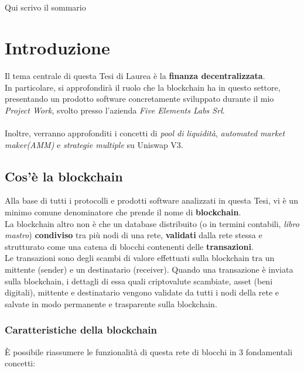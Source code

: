\documentclass[12pt,a4paper]{report}
\makeatletter
\renewenvironment{abstract}{%
    \if@twocolumn
      \section*{\abstractname}%
    \else
      \begin{center}%
        {\bfseries \Large\abstractname\vspace{\z@}}
      \end{center}%
      \quotation
    \fi}
    {\if@twocolumn\else\endquotation\fi}
\makeatother
\begin{document}
\begin{abstract}
   Qui scrivo il sommario
\end{abstract}
\tableofcontents






\chapter{Introduzione}
\noindent Il tema centrale di questa Tesi di Laurea è la \textbf{finanza decentralizzata}.\\ In particolare, si approfondirà il ruolo che la blockchain ha in questo settore, presentando un prodotto software concretamente sviluppato durante il mio  \textit{Project Work}, svolto presso l'azienda \textit{Five Elements Labs Srl}.
\\\\Inoltre, verranno approfonditi i concetti di \textit{pool di liquidità}, \textit{automated market maker(AMM)} e \textit{strategie multiple} su Uniswap V3.

\section{Cos'è la blockchain}

Alla base di tutti i protocolli e prodotti software analizzati in questa Tesi, vi è un minimo comune denominatore che prende il nome di \textbf{blockchain}\cite{blockchain}.
\\La blockchain altro non è che un database distribuito (o in termini contabili, \textit{libro mastro}) \textbf{condiviso} tra più nodi di una rete, \textbf{validati} dalla rete stessa e strutturato come una catena di blocchi contenenti delle \textbf{transazioni}.
\\Le transazioni sono degli scambi di valore effettuati sulla blockchain tra un mittente (sender) e un destinatario (receiver).
Quando una transazione è inviata sulla blockchain, i dettagli di essa quali criptovalute scambiate, asset (beni digitali), mittente e destinatario vengono validate da tutti i nodi della rete e salvate in modo permanente e trasparente sulla blockchain.


\subsection{Caratteristiche della blockchain}

È possibile riassumere le funzionalità di questa rete di blocchi in 3 fondamentali concetti:
\end{document}
